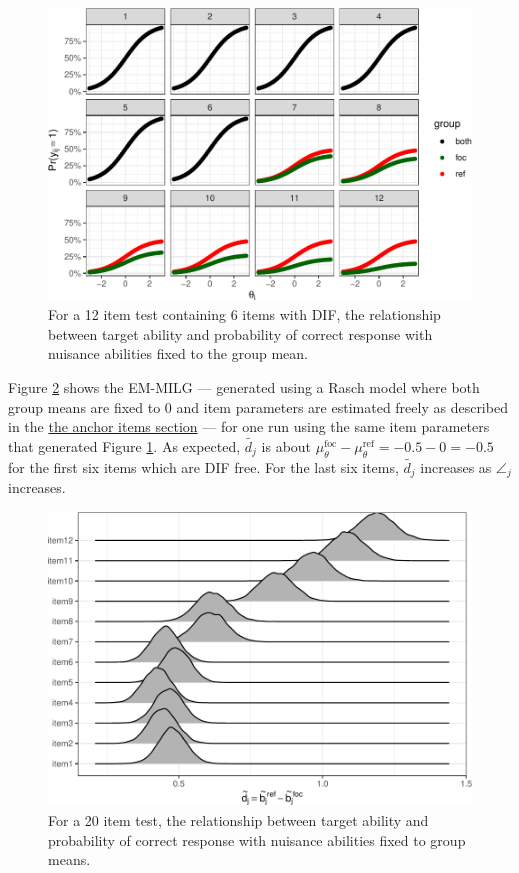 \documentclass[
  11pt,
]{article}
\begin{document}
\begin{figure}[H]

{\centering \includegraphics[width=0.7\linewidth]{paper_files/figure-latex/difmap-1} 

}

\caption{For a 12 item test containing 6 items with DIF, the relationship between target ability and probability of correct response with nuisance abilities fixed to the group mean.}\label{fig:difmap}
\end{figure}

Figure \ref{fig:simemmlg} shows the EM-MILG --- generated using a Rasch model where both group means are fixed to 0 and item parameters are estimated freely as described in the \protect\hyperlink{anchoritems}{the anchor items section} --- for one run using the same item parameters that generated Figure \ref{fig:difmap}. As expected, \(\tilde{d_j}\) is about \(\mu_\theta^\text{foc} - \mu_\theta^\text{ref} = -0.5 - 0 = -0.5\) for the first six items which are DIF free. For the last six items, \(\tilde{d_j}\) increases as \(\angle_j\) increases.

\begin{figure}[H]

{\centering \includegraphics[width=0.7\linewidth]{paper_files/figure-latex/simemmlg-1} 

}

\caption{For a 20 item test, the relationship between target ability and probability of correct response with nuisance abilities fixed to group means.}\label{fig:simemmlg}
\end{figure}
\end{document}
